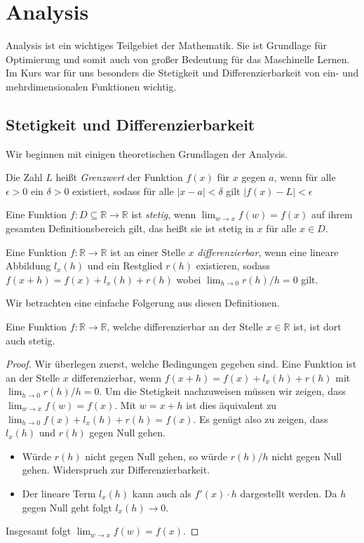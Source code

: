 \section{Analysis}

Analysis ist ein wichtiges Teilgebiet der Mathematik. Sie ist Grundlage für Optimierung und somit auch von großer Bedeutung für das Maschinelle Lernen. Im Kurs war für uns besonders die Stetigkeit und Differenzierbarkeit von ein- und mehrdimensionalen Funktionen wichtig.

\subsection{Stetigkeit und Differenzierbarkeit}

Wir beginnen mit einigen theoretischen Grundlagen der Analysis.
\begin{Def} Die Zahl $L$ heißt \emph{Grenzwert} der Funktion $f(x)$ für $x$ gegen $a$, wenn für alle $\epsilon > 0$ ein $\delta > 0$ existiert, sodass für alle $|x-a| < \delta$ gilt $|f(x)-L|<\epsilon$
\end{Def}
\begin{Def}
Eine Funktion $f: D \subseteq \mathbb{R}\rightarrow \mathbb{R}$ ist \emph{stetig}, wenn $\lim_{w\rightarrow x}f(w)=f(x)$ auf ihrem gesamten Definitionsbereich gilt, das heißt sie ist stetig in $x$ für alle $x\in D$.
\end{Def}
\begin{Def}
Eine Funktion $f:\mathbb{R}\rightarrow \mathbb{R}$ ist an einer Stelle $x$ \emph{differenzierbar}, wenn eine lineare Abbildung $ l_ x (h)$ und ein Restglied $r(h)$ existieren, sodass $f(x+h)=f(x)+l_{x}(h)+r(h)$ wobei $\lim_{h\rightarrow 0} r(h)/h= 0$ gilt.
\end{Def}
Wir betrachten eine einfache Folgerung aus diesen Definitionen.


\begin{Lem}
Eine Funktion $f:\mathbb{R} \rightarrow \mathbb{R}$, welche differenzierbar an der Stelle $x \in \mathbb{R}$ ist, ist dort auch stetig.
\end{Lem}

\begin{proof}
Wir überlegen zuerst, welche Bedingungen gegeben sind. Eine Funktion ist an der Stelle $x$ differenzierbar, wenn $f(x+h)=f(x)+l_x(h)+ r(h)$  mit $\lim_{h \rightarrow 0} r(h)/h= 0$. Um die Stetigkeit nachzuweisen müssen wir zeigen, dass $\lim_{w \rightarrow x} f(w)=f(x)$. Mit $w = x+h$ ist dies äquivalent zu $\lim_{h \rightarrow 0} f(x)+l_x(h)+r(h)=f(x)$. Es genügt also zu zeigen, dass  $l_x(h)$ und $r(h)$ gegen Null gehen.
\begin{itemize}
  \item Würde $r(h)$ nicht gegen Null gehen, so würde $r(h)/h$ nicht gegen Null gehen. Widerspruch zur Differenzierbarkeit.
  \item Der lineare Term $l_x(h)$ kann auch als $f'(x) \cdot h$ dargestellt werden. Da $h$ gegen Null geht folgt $l_x(h)\rightarrow 0$.
\end{itemize}
Insgesamt folgt $\lim_{w\rightarrow x} f(w) = f(x)$.
\end{proof}

